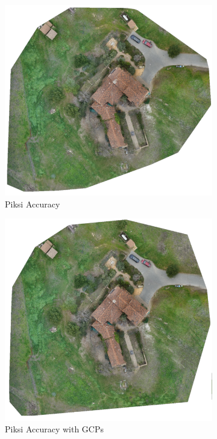 \documentclass{article}
\begin{document}
\begin{figure}
\begin{subfigure}{.33\textwidth}
  \centering
  \includegraphics[width=.72\linewidth]{images/orthomosaics/p_accurate.png}
  \caption{Piksi Accuracy }
  \label{fig:sub2}
\end{subfigure}
\begin{subfigure}{.33\textwidth}
  \centering
  \includegraphics[width=.72\linewidth]{images/orthomosaics/p_gcp_accurate.png}
  \caption{Piksi Accuracy with GCPs}
  \label{fig:sub1}
\end{subfigure}%
\begin{subfigure}{.33\textwidth}
  \centering

\end{subfigure}
\end{figure}
\end{document}
